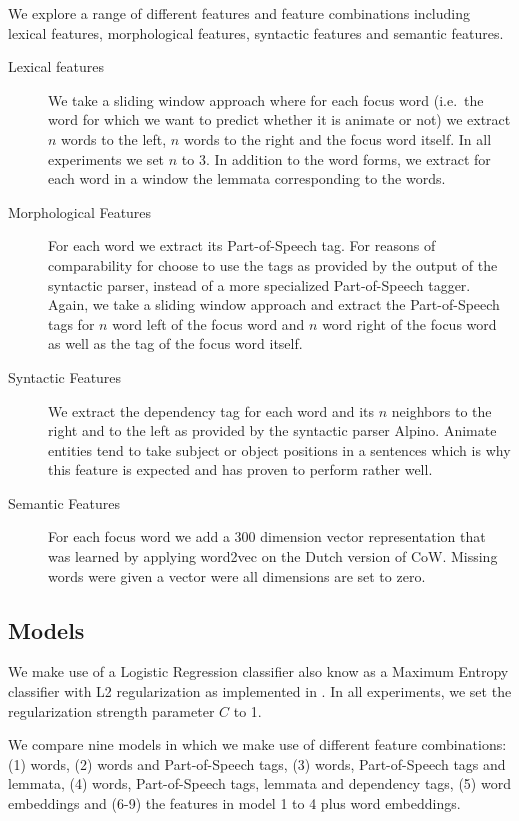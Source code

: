 \documentclass[a4paper,UKenglish]{oasics}
\begin{document}
We explore a range of different features and feature combinations
including lexical features, morphological features, syntactic features
and semantic features.

\begin{description}
\item[Lexical features]
We take a sliding window approach where for each focus word (i.e.\ the
word for which we want to predict whether it is animate or not) we
extract $n$ words to the left, $n$ words to the right and the focus
word itself. In all experiments we set $n$ to 3. In addition to the
word forms, we extract for each word in a window the lemmata
corresponding to the words.

\item[Morphological Features]
For each word we extract its Part-of-Speech tag. For reasons of
comparability for choose to use the tags as provided by the
output of the syntactic parser, instead of a more specialized
Part-of-Speech tagger. Again, we take a sliding window approach and
extract the Part-of-Speech tags for $n$ word left of the focus word
and $n$ word right of the focus word as well as the tag of the focus
word itself.

\item[Syntactic Features]
We extract the dependency tag for each word and its $n$ neighbors to
the right and to the left as provided by the syntactic parser
Alpino. Animate entities tend to take subject or object positions in a
sentences which is why this feature is expected and has proven to
perform rather well.

\item[Semantic Features]
For each focus word we add a 300 dimension vector representation that
was learned by applying word2vec on the Dutch version of CoW. Missing
words were given a vector were all dimensions are set to zero.

\end{description}


\subsection{Models}
We make use of a Logistic Regression classifier also know as a Maximum
Entropy classifier with L2 regularization as implemented in
\cite{sklearn}. In all experiments, we set the regularization strength
parameter $C$ to 1.

We compare nine models in which we make use of different feature
combinations: (1) words, (2) words and Part-of-Speech tags, (3)
words, Part-of-Speech tags and lemmata, (4) words, Part-of-Speech
tags, lemmata and dependency tags, (5) word embeddings and (6-9) the
features in model 1 to 4 plus word embeddings.
\end{document}
